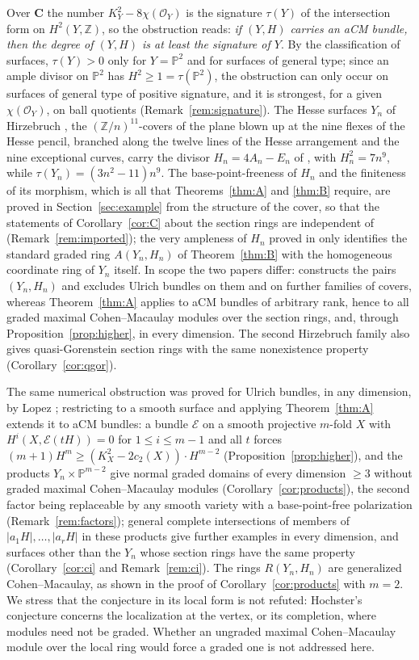 \documentclass[11pt]{amsart}
\theoremstyle{remark}
\theoremstyle{definition}
\newcommand{\PP}{\mathbb{P}}
\newcommand{\ZZ}{\mathbb{Z}}
\newcommand{\CC}{\mathbf{C}}
\newcommand{\cO}{\mathcal{O}}
\newcommand{\cE}{\mathcal{E}}
\begin{document}
Over $\CC$ the number $K_Y^2-8\chi(\cO_Y)$ is the signature $\tau(Y)$ of the intersection form on $H^2(Y,\ZZ)$, so the obstruction reads: \emph{if $(Y,H)$ carries an aCM bundle, then the degree of $(Y,H)$ is at least the signature of $Y$}. By the classification of surfaces, $\tau(Y)>0$ only for $Y=\PP^2$ and for surfaces of general type; since an ample divisor on $\PP^2$ has $H^2\ge1=\tau(\PP^2)$, the obstruction can only occur on surfaces of general type of positive signature, and it is strongest, for a given $\chi(\cO_Y)$, on ball quotients (Remark~\ref{rem:signature}). The Hesse surfaces $Y_n$ of Hirzebruch \cite{Hi,BHH}, the $(\ZZ/n)^{11}$-covers of the plane blown up at the nine flexes of the Hesse pencil, branched along the twelve lines of the Hesse arrangement and the nine exceptional curves, carry the divisor $H_n=4A_n-E_n$ of \cite{An}, with $H_n^2=7n^9$, while $\tau(Y_n)=(3n^2-11)n^9$. The base-point-freeness of $H_n$ and the finiteness of its morphism, which is all that Theorems~\ref{thm:A} and \ref{thm:B} require, are proved in Section~\ref{sec:example} from the structure of the cover, so that the statements of Corollary~\ref{cor:C} about the section rings are independent of \cite{An} (Remark~\ref{rem:imported}); the very ampleness of $H_n$ proved in \cite{An} only identifies the standard graded ring $A(Y_n,H_n)$ of Theorem~\ref{thm:B} with the homogeneous coordinate ring of $Y_n$ itself. In scope the two papers differ: \cite{An} constructs the pairs $(Y_n,H_n)$ and excludes Ulrich bundles on them and on further families of covers, whereas Theorem~\ref{thm:A} applies to aCM bundles of arbitrary rank, hence to all graded maximal Cohen--Macaulay modules over the section rings, and, through Proposition~\ref{prop:higher}, in every dimension. The second Hirzebruch family also gives quasi-Gorenstein section rings with the same nonexistence property (Corollary~\ref{cor:qgor}).

The same numerical obstruction was proved for Ulrich bundles, in any dimension, by Lopez \cite[Lem.~3.1]{Lo}; restricting to a smooth surface and applying Theorem~\ref{thm:A} extends it to aCM bundles: a bundle $\cE$ on a smooth projective $m$-fold $X$ with $H^i(X,\cE(tH))=0$ for $1\le i\le m-1$ and all $t$ forces $(m+1)H^m\ge(K_X^2-2c_2(X))\cdot H^{m-2}$ (Proposition~\ref{prop:higher}), and the products $Y_n\times\PP^{m-2}$ give normal graded domains of every dimension $\ge3$ without graded maximal Cohen--Macaulay modules (Corollary~\ref{cor:products}), the second factor being replaceable by any smooth variety with a base-point-free polarization (Remark~\ref{rem:factors}); general complete intersections of members of $|a_1H|,\dots,|a_rH|$ in these products give further examples in every dimension, and surfaces other than the $Y_n$ whose section rings have the same property (Corollary~\ref{cor:ci} and Remark~\ref{rem:ci}). The rings $R(Y_n,H_n)$ are generalized Cohen--Macaulay, as shown in the proof of Corollary~\ref{cor:products} with $m=2$. We stress that the conjecture in its local form is not refuted: Hochster's conjecture concerns the localization at the vertex, or its completion, where modules need not be graded. Whether an ungraded maximal Cohen--Macaulay module over the local ring would force a graded one is not addressed here.
\end{document}
